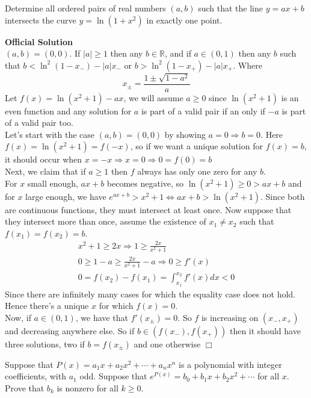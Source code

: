 \begin{problem}[D][10][Putnam 2022 A1]
    Determine all ordered pairs of real numbers $(a, b)$ such that the line $y = ax + b$ intersects the curve $y = \ln(1 + x^2)$ in exactly one point.
\end{problem}
\vskip 3mm
\textbf{Official Solution}\\
    $(a,b)=(0,0)$. If $|a| \geq 1$ then any $b \in \mathbb{R}$, and if $a \in (0,1)$ then any $b$ such that $b < \ln^2(1-x_-)-|a|x_-$ or $b> \ln^2(1-x_+)-|a|x_+$. Where
    $$ x_\pm = \frac{1\pm \sqrt{1-a^2}}{a}$$
    Let $f(x)=\ln(x^2+1)-ax$, we will assume $a \geq 0$ since $\ln(x^2+1)$ is an even function and any solution for $a$ is part of a valid pair if an only if $-a$ is part of a valid pair too.\vspace{7pt} \\
    Let's start with the case $(a,b)=(0,0)$ by showing $a=0 \Rightarrow b=0$. Here $f(x)=\ln(x^2+1)=f(-x)$, so if we want a unique solution for $f(x)=b$, it should occur when $x=-x \Rightarrow x=0 \Rightarrow 0=f(0)=b$ \vspace{7pt} \\
    Next, we claim that if $a \geq 1$ then $f$ always has only one zero for any $b$.\\
    For $x$ small enough, $ax+b$ becomes negative, so $\ln(x^2+1)\geq 0 > ax+b$ and
    for $x$ large enough, we have $e^{ax+b}>x^2+1 \iff ax+b>\ln(x^2+1)$. Since both are continuous functions, they must intersect at least once. Now suppose that they intersect more than once, assume the existence of $x_1 \neq x_2$ such that $f(x_1)=f(x_2)=b$.
    \begin{align*}
    x^2+1 \geq 2x \Rightarrow 1 \geq \frac{2x}{x^2+1}  \\
    0 \geq 1-a \geq \frac{2x}{x^2+1}-a \Rightarrow 0 \geq f'(x) \\ 
    0=f(x_2)-f(x_1)=\int_{x_1}^{x_2} f'(x)dx < 0 
    \end{align*}
    Since there are infinitely many cases for which the equality case does not hold. Hence there's a unique $x$ for which $f(x)=0$. \vspace{7pt} \\
    Now, if $a \in (0,1)$, we have that $f'(x_\pm)=0$. So $f$ is increasing on $(x_-,x_+)$ and decreasing anywhere else. So if $b \in (f(x_-),f(x_+))$ then it should have three solutions, two if $b=f(x_\pm)$ and one otherwise $\Box$


\begin{problem}[D][7][Putnam 2022 B1]
    Suppose that $P(x) = a_1x + a_2x^2 + \cdots + a_nx^n$ is a polynomial with integer coefficients, with $a_1$ odd. Suppose that $e^{P(x)} = b_0 + b_1x + b_2x^2 + \cdots$ for all $x$. Prove that $b_k$ is nonzero for all $k \geq 0$.
\end{problem}

